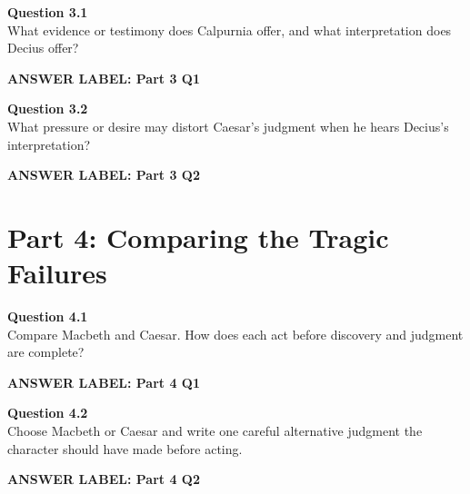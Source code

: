 \documentclass[12pt]{article}
\newcommand{\answerbox}[2]{%
\vspace{0.12em}
\noindent\textbf{#1}\par
\vspace{0.04em}
\noindent\fbox{%
\begin{minipage}[t][#2]{\dimexpr\textwidth-2\fboxsep-2\fboxrule}
\rule{\textwidth}{0pt}
\vspace{#2}
\end{minipage}}
\par\vspace{0.22em}}
\begin{document}
\textbf{Question 3.1}\\[-0.15em]
What evidence or testimony does Calpurnia offer, and what interpretation does Decius offer?

\answerbox{ANSWER LABEL: Part 3 Q1}{2.35in}

\textbf{Question 3.2}\\[-0.15em]
What pressure or desire may distort Caesar's judgment when he hears Decius's interpretation?

\answerbox{ANSWER LABEL: Part 3 Q2}{2.4in}

\newpage

\section*{Part 4: Comparing the Tragic Failures}

\textbf{Question 4.1}\\[-0.15em]
Compare Macbeth and Caesar. How does each act before discovery and judgment are complete?

\answerbox{ANSWER LABEL: Part 4 Q1}{2.65in}

\textbf{Question 4.2}\\[-0.15em]
Choose Macbeth or Caesar and write one careful alternative judgment the character should have made before acting.

\answerbox{ANSWER LABEL: Part 4 Q2}{2.55in}
\end{document}
